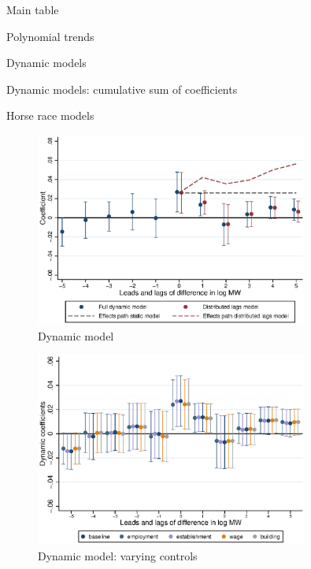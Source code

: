 \documentclass{article}
\begin{document}
\begin{table}[h!] \centering
   \caption{Main table}
   
\end{table}

\begin{table}[h!] \centering
	\caption{Polynomial trends}
	
\end{table}

\clearpage
\begin{table}[h!] \centering
	\caption{Dynamic models}
	
\end{table}

\begin{table}[h!] \centering
	\caption{Dynamic models: cumulative sum of coefficients}
	
\end{table}


\clearpage
\begin{table}[h!] \centering
	\caption{Horse race models}
	\resizebox{\textwidth}{!}{
		
	}
\end{table}

\clearpage
\begin{figure} \centering
	\caption{Dynamic model}
	\includegraphics[width = 0.8\textwidth]{../../analysis/first_differences/output/fd_models.eps}
\end{figure}


\begin{figure} \centering
	\caption{Dynamic model: varying controls}
	\includegraphics[width = 0.8\textwidth]{../../analysis/first_differences/output/fd_models_control.eps}
\end{figure}
   
\end{document}
